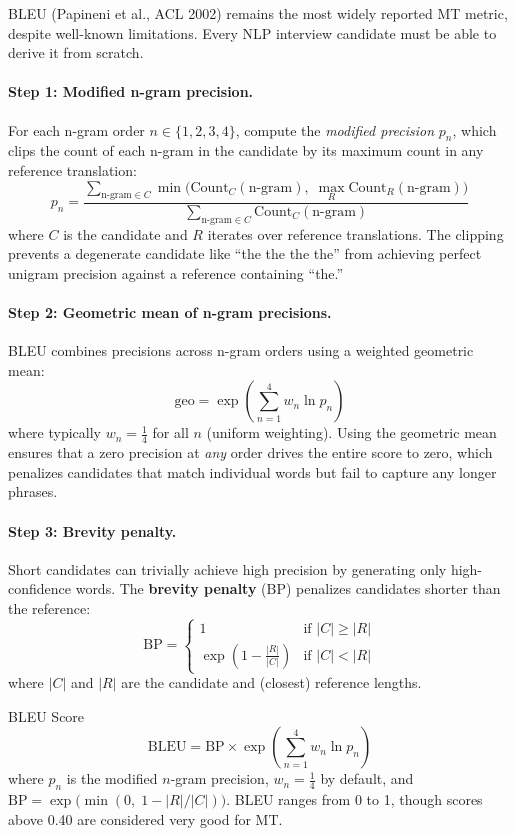 BLEU (Papineni et al., ACL 2002) remains the most widely reported MT metric,
despite well-known limitations.  Every NLP interview candidate must be able to
derive it from scratch.

\paragraph{Step 1: Modified n-gram precision.}
For each n-gram order $n \in \{1,2,3,4\}$, compute the \emph{modified precision}
$p_n$, which clips the count of each n-gram in the candidate by its maximum count
in any reference translation:
\[
    p_n = \frac{\sum_{\text{n-gram} \in C}\min\!\bigl(\text{Count}_C(\text{n-gram}),\;\max_{R}\text{Count}_R(\text{n-gram})\bigr)}{\sum_{\text{n-gram} \in C}\text{Count}_C(\text{n-gram})}
\]
where $C$ is the candidate and $R$ iterates over reference translations.  The
clipping prevents a degenerate candidate like ``the the the the'' from achieving
perfect unigram precision against a reference containing ``the.''

\paragraph{Step 2: Geometric mean of n-gram precisions.}
BLEU combines precisions across n-gram orders using a weighted geometric mean:
\[
    \text{geo} = \exp\!\left(\sum_{n=1}^{4} w_n \ln p_n\right)
\]
where typically $w_n = \frac{1}{4}$ for all $n$ (uniform weighting).  Using the
geometric mean ensures that a zero precision at \emph{any} order drives the
entire score to zero, which penalizes candidates that match individual words but
fail to capture any longer phrases.

\paragraph{Step 3: Brevity penalty.}
Short candidates can trivially achieve high precision by generating only
high-confidence words.  The \textbf{brevity penalty} (BP) penalizes candidates
shorter than the reference:
\[
    \text{BP} = \begin{cases}
        1 & \text{if } |C| \geq |R| \\[4pt]
        \exp\!\left(1 - \frac{|R|}{|C|}\right) & \text{if } |C| < |R|
    \end{cases}
\]
where $|C|$ and $|R|$ are the candidate and (closest) reference lengths.

\begin{mathresult}{BLEU Score}
\[
    \text{BLEU} = \text{BP} \times \exp\!\left(\sum_{n=1}^{4} w_n \ln p_n\right)
\]
where $p_n$ is the modified $n$-gram precision, $w_n = \tfrac{1}{4}$ by default,
and $\text{BP} = \exp\!\bigl(\min(0,\; 1 - |R|/|C|)\bigr)$.  BLEU ranges from
0 to 1, though scores above 0.40 are considered very good for MT.
\end{mathresult}

